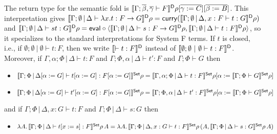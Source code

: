 \documentclass{lmcs}
\theoremstyle{plain}\newtheorem{satz}[thm]{Satz}
\begin{document}
The return type for the semantic fold is
  $\llbracket{\Gamma;\overline{\beta},\overline{\gamma} \vdash F}\rrbracket^{\mathsf D}\rho[\overline{\gamma :=
    C}][\overline{\beta := B}]$.
  This interpretation gives $\llbracket{\Gamma;\emptyset \,|\, \Delta
    \vdash \lambda x.t : F \to G}\rrbracket^{\mathsf D}\rho = \mathsf{curry}
  (\llbracket{\Gamma;\emptyset \,|\, \Delta, x : F \vdash t :
    G}\rrbracket^{\mathsf D}\rho)$ and $\llbracket{\Gamma;\emptyset \,|\, \Delta \vdash st:
    G}\rrbracket^{\mathsf D} \rho = \mathsf{eval} \circ \langle \llbracket{\Gamma;\emptyset \,|\,
    \Delta \vdash s: F \to G}\rrbracket^{\mathsf D}\rho, \llbracket{\Gamma;\emptyset
    \,|\, \Delta \vdash t: F}\rrbracket^{\mathsf D}\rho \rangle$, so it specializes to
  the standard interpretations for System F terms.  If $t$ is closed,
  i.e., if $\emptyset; \emptyset~|~\emptyset \vdash t : F$, then we
  write $\llbracket{\vdash t : F}\rrbracket^{\mathsf D}$ instead of $\llbracket{\emptyset;
    \emptyset~|~\emptyset \vdash t : F}\rrbracket^{\mathsf D}$.
Moreover, if
  $\Gamma,\alpha;\Phi \,|\, \Delta \vdash t : F$ and
  $\Gamma;\Phi,\alpha \,|\, \Delta \vdash t' : F$ and $\Gamma;\Phi
  \vdash G$ then
\begin{itemize}
\item $\llbracket{\Gamma;\Phi \,|\, \Delta[\alpha := G] \vdash
  t[\alpha := G] : F[\alpha := G]}\rrbracket^{\mathsf{Set}}\rho =
  \llbracket{\Gamma,\alpha;\Phi \,|\, \Delta \vdash t : F }\rrbracket^{\mathsf{Set}}\rho [
    \alpha := \llbracket{\Gamma;\Phi\vdash G}\rrbracket^{\mathsf{Set}}\rho ]$
\item $\llbracket{\Gamma;\Phi \,|\, \Delta[\alpha := G] \vdash
  t'[\alpha := G] : F[\alpha := G]}\rrbracket^{\mathsf{Set}}\rho =
  \llbracket{\Gamma;\Phi,\alpha \,|\, \Delta \vdash t' : F }\rrbracket^{\mathsf{Set}}\rho [
    \alpha := \llbracket{\Gamma;\Phi\vdash G}\rrbracket^{\mathsf{Set}}\rho ]$
\end{itemize}
and if $\Gamma;\Phi \,|\, \Delta, x: G \vdash t : F$ and
$\Gamma;\Phi \,|\, \Delta \vdash s : G$ then
\begin{itemize}
\item $\lambda A.\, \llbracket{\Gamma;\Phi \,|\, \Delta \vdash t[x := s]
  : F }\rrbracket^{\mathsf{Set}}\rho \, A = \lambda A.\,\llbracket{\Gamma;\Phi \,|\, \Delta, x:
  G \vdash t : F}\rrbracket^{\mathsf{Set}}\rho \,(A, \llbracket{\Gamma;\Phi \,|\,
  \Delta\vdash s: G}\rrbracket^{\mathsf{Set}}\rho\, A)$
\end{itemize}
\end{document}
